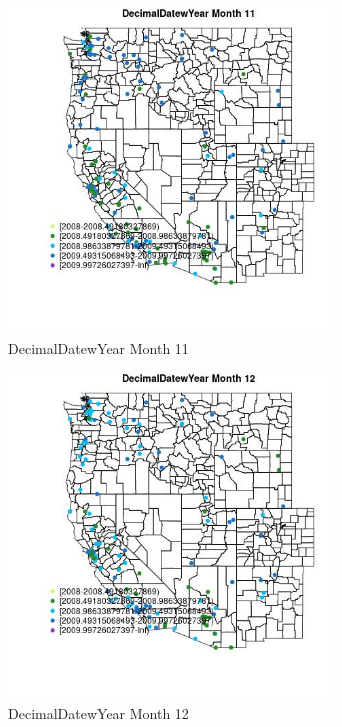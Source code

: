 \begin{figure} 
\centering  
\includegraphics[width=0.77\textwidth]{Code_Outputs/Report_ML_input_PM25_Step4_part_e_de_duplicated_aves_MapObsMo11DecimalDatewYear.jpg} 
\caption{\label{fig:Report_ML_input_PM25_Step4_part_e_de_duplicated_avesMapObsMo11DecimalDatewYear}DecimalDatewYear Month 11} 
\end{figure} 
 

\clearpage 

\begin{figure} 
\centering  
\includegraphics[width=0.77\textwidth]{Code_Outputs/Report_ML_input_PM25_Step4_part_e_de_duplicated_aves_MapObsMo12DecimalDatewYear.jpg} 
\caption{\label{fig:Report_ML_input_PM25_Step4_part_e_de_duplicated_avesMapObsMo12DecimalDatewYear}DecimalDatewYear Month 12} 
\end{figure} 
 

